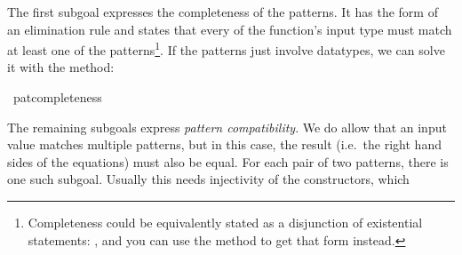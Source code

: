 \begin{isabellebody}
\begin{isamarkuptxt}
  The first subgoal expresses the completeness of the patterns. It has
  the form of an elimination rule and states that every  of
  the function's input type must match at least one of the patterns\footnote{Completeness could
  be equivalently stated as a disjunction of existential statements: 
, and you can use the method  to get that form instead.}. If the patterns just involve
  datatypes, we can solve it with the 
  method:%
\end{isamarkuptxt}%
\isamarkuptrue%
\isamarkupfalse%
\ pat{}completeness%
\begin{isamarkuptxt}%
The remaining subgoals express \emph{pattern compatibility}. We do
  allow that an input value matches multiple patterns, but in this
  case, the result (i.e.~the right hand sides of the equations) must
  also be equal. For each pair of two patterns, there is one such
  subgoal. Usually this needs injectivity of the constructors, which

\end{isamarkuptxt}
\end{isabellebody}
